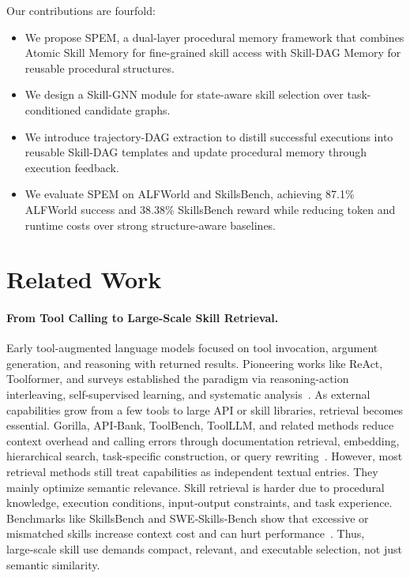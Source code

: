 \documentclass[letterpaper]{article} %
\newcommand{\model}{\textsc{SPEM}}
\begin{document}
Our contributions are fourfold:
\begin{itemize}
    \item We propose \model{}, a dual-layer procedural memory framework that combines Atomic Skill Memory for fine-grained skill access with Skill-DAG Memory for reusable procedural structures.
    \item We design a Skill-GNN module for state-aware skill selection over task-conditioned candidate graphs.
    \item We introduce trajectory-DAG extraction to distill successful executions into reusable Skill-DAG templates and update procedural memory through execution feedback.
    \item We evaluate \model{} on ALFWorld and SkillsBench, achieving 87.1\% ALFWorld success and 38.38\% SkillsBench reward while reducing token and runtime costs over strong structure-aware baselines.
\end{itemize}

\section{Related Work}

\paragraph{From Tool Calling to Large-Scale Skill Retrieval.}
Early tool-augmented language models focused on tool invocation, argument generation, and reasoning with returned results. Pioneering works like ReAct, Toolformer, and surveys established the paradigm via reasoning-action interleaving, self‑supervised learning, and systematic analysis~\cite{yao2023react,schick2023toolformer,mialon2023augmented}. As external capabilities grow from a few tools to large API or skill libraries, retrieval becomes essential. Gorilla, API‑Bank, ToolBench, ToolLLM, and related methods reduce context overhead and calling errors through documentation retrieval, embedding, hierarchical search, task‑specific construction, or query rewriting~\cite{patil2023gorilla,li2023apibank,xu2023toolbench,qin2024toolllm,hao2023toolkengpt,du2024anytool,yuan2023craft,chen2024reinvoke}. However, most retrieval methods still treat capabilities as independent textual entries. They mainly optimize semantic relevance.
Skill retrieval is harder due to procedural knowledge, execution conditions, input‑output constraints, and task experience. Benchmarks like SkillsBench and SWE‑Skills‑Bench show that excessive or mismatched skills increase context cost and can hurt performance~\cite{li2026skillsbench,han2026sweskillsbench}. Thus, large‑scale skill use demands compact, relevant, and executable selection, not just semantic similarity.
\end{document}
